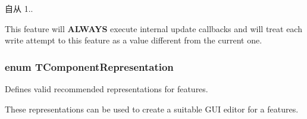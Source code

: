 \begin{Desc}
\begin{description}
\begin{DoxySince}{自从}
1.. 
\end{DoxySince}
\item[{\em 
\hypertarget{group___common_interface_gga4ef1be7cf1ca9dd256fd3060dd0787bbac7b65e7daa46d79ff840070fbdfa8c6f}{cf\+Always\+Force\+Update}\label{group___common_interface_gga4ef1be7cf1ca9dd256fd3060dd0787bbac7b65e7daa46d79ff840070fbdfa8c6f}
}]This feature will {\bfseries A\+L\+W\+A\+Y\+S} execute internal update callbacks and will treat each write attempt to this feature as a value different from the current one. \end{description}
\end{Desc}
\hypertarget{group___common_interface_ga1e2d7ac6b3bb3ff1fe4bb53c4aa808ea}{
\subsubsection[{T\+Component\+Representation}]{\setlength{\rightskip}{0pt plus 5cm}enum {\bf T\+Component\+Representation}}}\label{group___common_interface_ga1e2d7ac6b3bb3ff1fe4bb53c4aa808ea}


Defines valid recommended representations for features. 

These representations can be used to create a suitable G\+U\+I editor for a features.

